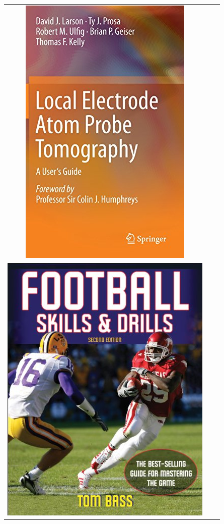 \documentclass[conference]{IEEEtran}
\begin{document}
\begin{table}[hbtp]
\begin{center}
\begin{tabular}{c c c}
  \includegraphics[scale=0.2]{pics/results_image/2.jpeg} \\
  \includegraphics[scale=0.2]{pics/results_image/3.jpeg} &

\end{tabular}
\end{center}
\end{table}
\end{document}
